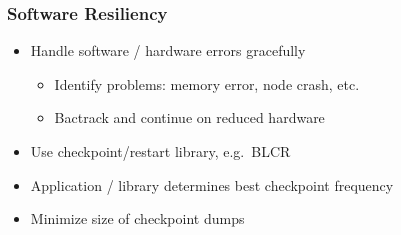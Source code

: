 \begin{frame}[fragile] \frametitle{Software Resiliency}
\begin{itemize}
  \item Handle software / hardware errors gracefully
  \begin{itemize}
     \item Identify problems: memory error, node crash, etc.
     \item Bactrack and continue on reduced hardware
  \end{itemize}
  \item Use checkpoint/restart library, e.g.~BLCR
  \item Application / library determines best checkpoint frequency
  \item Minimize size of checkpoint dumps
  \end{itemize}
\end{frame}
